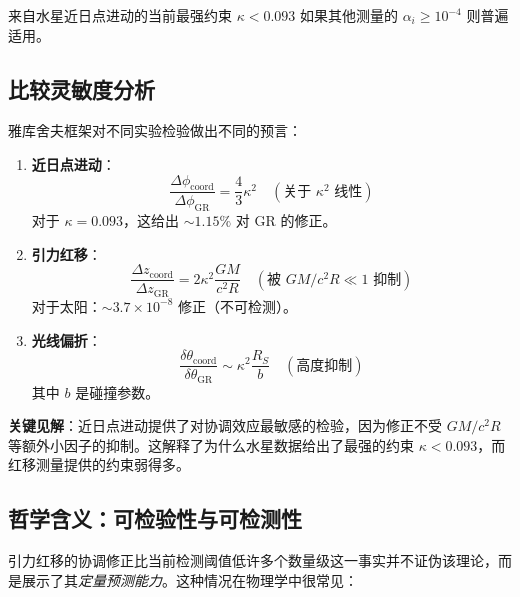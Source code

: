 \documentclass[11pt,a4paper]{article}
\begin{document}
	来自水星近日点进动的当前最强约束 $\kappa < 0.093$ 如果其他测量的 $\alpha_i \geq 10^{-4}$ 则普遍适用。
	
	\subsection{比较灵敏度分析}
	\label{subsec:comparative-sensitivity}
	
	雅库舍夫框架对不同实验检验做出不同的预言：
	
	\begin{enumerate}
		\item \textbf{近日点进动}： 
		\[
		\frac{\Delta\phi_{\text{coord}}}{\Delta\phi_{\text{GR}}} = \frac{4}{3}\kappa^2 \quad (\text{关于 }\kappa^2\text{ 线性})
		\]
		对于 $\kappa = 0.093$，这给出 $\sim 1.15\%$ 对 GR 的修正。
		
		\item \textbf{引力红移}：
		\[
		\frac{\Delta z_{\text{coord}}}{\Delta z_{\text{GR}}} = 2\kappa^2 \frac{GM}{c^2R} \quad (\text{被 }GM/c^2R \ll 1\text{ 抑制})
		\]
		对于太阳：$\sim 3.7\times10^{-8}$ 修正（不可检测）。
		
		\item \textbf{光线偏折}：
		\[
		\frac{\delta\theta_{\text{coord}}}{\delta\theta_{\text{GR}}} \sim \kappa^2 \frac{R_S}{b} \quad (\text{高度抑制})
		\]
		其中 $b$ 是碰撞参数。
	\end{enumerate}
	
	\textbf{关键见解}：近日点进动提供了对协调效应最敏感的检验，因为修正不受 $GM/c^2R$ 等额外小因子的抑制。这解释了为什么水星数据给出了最强的约束 $\kappa < 0.093$，而红移测量提供的约束弱得多。
	
	\subsection{哲学含义：可检验性与可检测性}
	\label{subsec:philosophy-testability}
	
	引力红移的协调修正比当前检测阈值低许多个数量级这一事实并不证伪该理论，而是展示了其\textit{定量预测能力}。这种情况在物理学中很常见：
	
\end{document}
